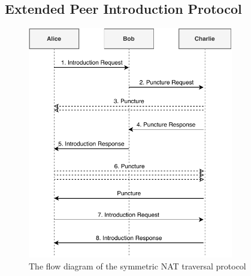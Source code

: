 \subsection{Extended Peer Introduction Protocol}

\begin{figure}[h!]
    \centering
    \includegraphics[width=0.8\textwidth]{diagrams/symmetric-nat-puncturing}
    \caption{The flow diagram of the symmetric NAT traversal protocol}
\end{figure}





